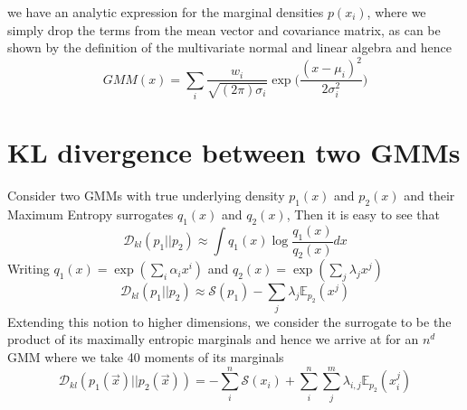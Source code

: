 \documentclass[journal]{IEEEtran}
\begin{document}
we have an analytic expression for the marginal densities $p(x_{i})$, where we simply drop the terms from the mean vector and covariance matrix, as can be shown by the definition of the multivariate normal and linear algebra and hence
\begin{equation}
GMM(x) = \sum_{i}\frac{w_{i}}{\sqrt{(2\pi)\sigma_{i}}}\exp\bigg(\frac{(x-\mu_{i})^{2}}{2\sigma_{i}^{2}}\bigg)
\end{equation}

\section{KL divergence between two GMMs}
Consider two GMMs with true underlying density $p_{1}(x)$ and $p_{2}(x)$ and their Maximum Entropy surrogates $q_{1}(x)$ and $q_{2}(x)$, Then it is easy to see that
\begin{equation}
\mathcal{D}_{kl}(p_{1}||p_{2}) \approx \int q_{1}(x) \log \frac{q_{1}(x)}{q_{2}(x)}dx
\end{equation}
Writing $q_{1}(x) = \exp(\sum_{i}\alpha_{i}x^{i})$ and $q_{2}(x) = \exp(\sum_{j}\lambda_{j}x^{j})$
\begin{equation}
\mathcal{D}_{kl}(p_{1}||p_{2}) \approx \mathcal{S}(p_{1}) - \sum_{j}\lambda_{j}\mathbb{E}_{p_{2}}(x^{j})
\end{equation}
Extending this notion to higher dimensions, we consider the surrogate to be the product of its maximally entropic marginals and hence we arrive at for an $n^{d}$ GMM where we take 40 moments of its marginals
\begin{equation}
\mathcal{D}_{kl}(p_{1}(\vec{x})||p_{2}(\vec{x})) = -\sum_{i}^{n}\mathcal{S}(x_{i})+\sum_{i}^{n}\sum_{j}^{m}\lambda_{i,j}\mathbb{E}_{p_{2}}(x^{j}_{i})
\end{equation}
\end{document}
